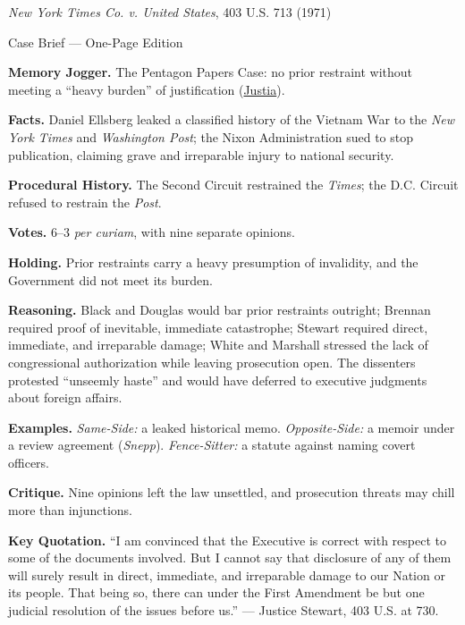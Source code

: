 \documentclass[12pt]{article}
\begin{document}
\begin{center}
{\Large \textit{New York Times Co. v. United States}, 403 U.S. 713 (1971)\par}
\vspace{0.3em}
{\normalsize Case Brief --- One-Page Edition\par}
\end{center}

\textbf{Memory Jogger.} The Pentagon Papers Case: no prior restraint without meeting a ``heavy burden'' of justification (\href{https://supreme.justia.com/cases/federal/us/403/713/}{Justia}).

\textbf{Facts.} Daniel Ellsberg leaked a classified history of the Vietnam War to the \textit{New York Times} and \textit{Washington Post}; the Nixon Administration sued to stop publication, claiming grave and irreparable injury to national security.

\textbf{Procedural History.} The Second Circuit restrained the \textit{Times}; the D.C. Circuit refused to restrain the \textit{Post}.

\textbf{Votes.} 6--3 \textit{per curiam}, with nine separate opinions.

\textbf{Holding.} Prior restraints carry a heavy presumption of invalidity, and the Government did not meet its burden.

\textbf{Reasoning.} Black and Douglas would bar prior restraints outright; Brennan required proof of inevitable, immediate catastrophe; Stewart required direct, immediate, and irreparable damage; White and Marshall stressed the lack of congressional authorization while leaving prosecution open. The dissenters protested ``unseemly haste'' and would have deferred to executive judgments about foreign affairs.

\textbf{Examples.} \emph{Same-Side:} a leaked historical memo. \emph{Opposite-Side:} a memoir under a review agreement (\textit{Snepp}). \emph{Fence-Sitter:} a statute against naming covert officers.

\textbf{Critique.} Nine opinions left the law unsettled, and prosecution threats may chill more than injunctions.

\textbf{Key Quotation.} ``I am convinced that the Executive is correct with respect to some of the documents involved. But I cannot say that disclosure of any of them will surely result in direct, immediate, and irreparable damage to our Nation or its people. That being so, there can under the First Amendment be but one judicial resolution of the issues before us.'' --- Justice Stewart, 403 U.S. at 730.
\end{document}
